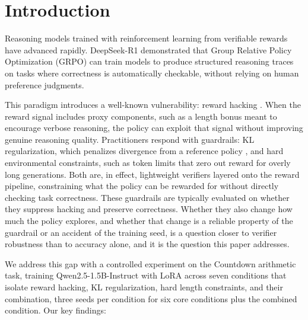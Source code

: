 \documentclass{article}
\begin{document}
\section{Introduction}

Reasoning models trained with reinforcement learning from verifiable rewards have advanced rapidly. DeepSeek-R1 \citep{deepseek2024} demonstrated that Group Relative Policy Optimization (GRPO) \citep{shao2024} can train models to produce structured reasoning traces on tasks where correctness is automatically checkable, without relying on human preference judgments.

This paradigm introduces a well-known vulnerability: reward hacking \citep{skalse2022, gao2023}. When the reward signal includes proxy components, such as a length bonus meant to encourage verbose reasoning, the policy can exploit that signal without improving genuine reasoning quality. Practitioners respond with guardrails: KL regularization, which penalizes divergence from a reference policy \citep{ziegler2019, ouyang2022}, and hard environmental constraints, such as token limits that zero out reward for overly long generations. Both are, in effect, lightweight verifiers layered onto the reward pipeline, constraining what the policy can be rewarded for without directly checking task correctness. These guardrails are typically evaluated on whether they suppress hacking and preserve correctness. Whether they also change how much the policy explores, and whether that change is a reliable property of the guardrail or an accident of the training seed, is a question closer to verifier robustness than to accuracy alone, and it is the question this paper addresses.

We address this gap with a controlled experiment on the Countdown arithmetic task, training Qwen2.5-1.5B-Instruct with LoRA across seven conditions that isolate reward hacking, KL regularization, hard length constraints, and their combination, three seeds per condition for six core conditions plus the combined condition. Our key findings:
\end{document}

